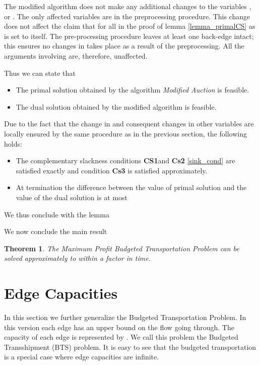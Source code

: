 \documentclass[11pt]{article}
\newenvironment{proof}{\par\noindent{\bf Proof:}}{\mbox{}\hfill\\}
\newtheorem{theorem}{Theorem}[section]
\newcounter{rem}
\begin{document}
{\begin{proof}
The modified algorithm does not make any additional changes to the variables ,
 or . The only affected variables are  in the 
preprocessing procedure. This 
change does not affect the claim that  for  all  in the proof
of lemma \ref{lemma_primalCS} as  is set to  itself. 
The pre-processing procedure 
leaves at least one back-edge intact; this ensures no changes in  takes place as 
a result of the preprocessing. All the arguments involving  are, therefore, unaffected.

Thus we can state that
\begin{itemize}

\item
The primal solution obtained by the algorithm {\em Modified Auction} is feasible.

\item
The dual solution obtained by the modified algorithm is feasible.

\end{itemize}


Due to the fact that the change in  and consequent changes in other variables are
locally ensured by the same procedure as  in the previous section, the following holds:
\begin{itemize}

\item
The complementary slackness conditions {\bf CS1}and {\bf Cs2}
\ref{sink_cond} 
are satisfied exactly and condition  {\bf Cs3}
is satisfied approximately.

\item
At termination the difference between the value of 
primal solution  and the value of the 
dual solution is at most 

\end{itemize}

We thus conclude with the lemma
\end{proof}

We now conclude the main result

\begin{theorem}
The Maximum Profit Budgeted Transportation Problem can be solved approximately to within
a factor  in   time.
\end{theorem}
}
\section{Edge Capacities}
\label{Edge-formal}

In this section we further generalize the Budgeted Transportation Problem. In this version
each edge has an upper bound on the flow going through. The capacity of each edge
is represented by . We call this problem the Budgeted
Transshipment (BTS) problem. It is easy to see that the budgeted transportation is a special
case where edge capacities are infinite. 
\end{document}
